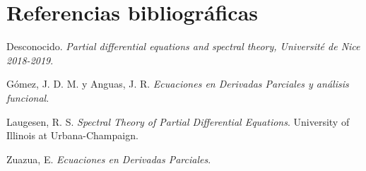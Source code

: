 \documentclass{article}
\begin{document}
\newpage

\section{Referencias bibliográficas}

\renewcommand{\refname}{}
\begin{thebibliography}{9}

    Desconocido. \emph{Partial differential equations and spectral theory, Université de Nice 2018-2019}.
    
    Gómez, J. D. M. y Anguas, J. R. \emph{Ecuaciones en Derivadas Parciales y análisis funcional}.
    
    Laugesen, R. S. \emph{Spectral Theory of Partial Differential Equations}. University of Illinois at Urbana-Champaign.
    
    Zuazua, E. \emph{Ecuaciones en Derivadas Parciales}.
    
    \end{thebibliography}
\end{document}
